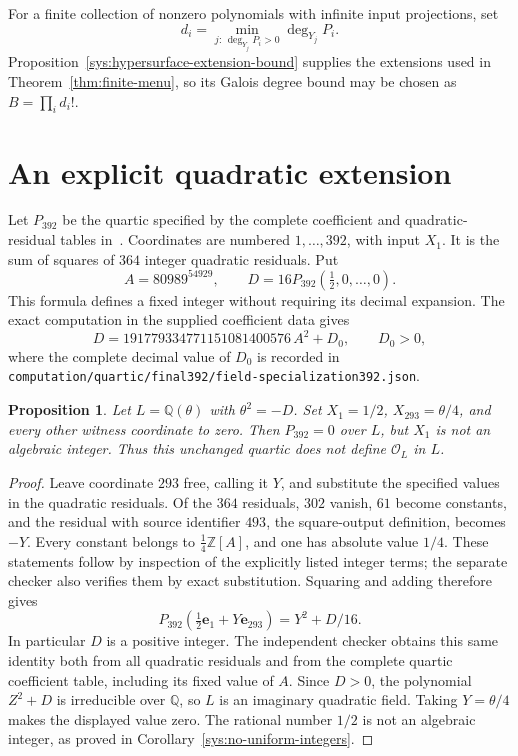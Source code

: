 \documentclass[11pt,a4paper]{article}
\newtheorem{proposition}[theorem]{Proposition}
\theoremstyle{definition}\newtheorem{definition}[theorem]{Definition}
\theoremstyle{remark}\newtheorem{remark}[theorem]{Remark}
\begin{document}
For a finite collection of nonzero polynomials with infinite input
projections, set
\[
 d_i=\min_{j:\,\deg_{Y_j}P_i>0}\deg_{Y_j}P_i.
\]
Proposition~\ref{sys:hypersurface-extension-bound} supplies the extensions
used in Theorem~\ref{thm:finite-menu}, so its Galois degree bound may be
chosen as $B=\prod_i d_i!$.

\section{An explicit quadratic extension}

Let $P_{392}$ be the quartic specified by the complete coefficient
and quadratic-residual tables in~\cite{QuarticData}. Coordinates are numbered $1,\ldots,392$,
with input $X_1$. It is the sum of squares of $364$ integer quadratic
residuals. Put
\[
 A=80989^{54929},\qquad
 D=16P_{392}(\tfrac12,0,\ldots,0).
\]
This formula defines a fixed integer without requiring its decimal
expansion. The exact computation in the supplied coefficient data gives
\[
 D=191779334771151081400576\,A^2+D_0,\qquad D_0>0,
\]
where the complete decimal value of $D_0$ is recorded in
\nolinkurl{computation/quartic/final392/field-specialization392.json}.

\begin{proposition}\label{sys:explicit-quartic-extension}
Let $L=\mathbb Q(\theta)$ with $\theta^2=-D$. Set $X_1=1/2$,
$X_{293}=\theta/4$, and every other witness coordinate to zero.
Then $P_{392}=0$ over $L$, but $X_1$ is not an algebraic integer.
Thus this unchanged quartic does not define $\mathcal O_L$ in $L$.
\end{proposition}
\begin{proof}
Leave coordinate $293$ free, calling it $Y$, and substitute the
specified values in the quadratic residuals. Of the $364$ residuals,
$302$ vanish, $61$ become constants, and the residual with source
identifier $493$, the square-output definition, becomes $-Y$.
Every constant belongs to $\tfrac14\mathbb Z[A]$, and one has absolute value $1/4$.
These statements follow by inspection of the explicitly listed
integer terms; the separate checker also verifies them by exact
substitution. Squaring and adding therefore gives
\[
 P_{392}(\tfrac12\mathbf e_1+Y\mathbf e_{293})
                      =Y^2+D/16.
\]
In particular $D$ is a positive integer. The independent checker
obtains this same identity both from all quadratic residuals and from
the complete quartic coefficient table, including its fixed value of $A$.
Since $D>0$, the polynomial $Z^2+D$ is irreducible over $\mathbb Q$,
so $L$ is an imaginary quadratic field. Taking $Y=\theta/4$ makes
the displayed value zero. The rational number $1/2$ is not an
algebraic integer, as proved in Corollary~\ref{sys:no-uniform-integers}.
\end{proof}
\end{document}

